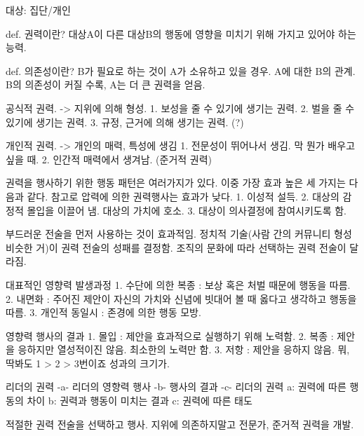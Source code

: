 대상: 집단/개인

def. 권력이란? 대상A이 다른 대상B의 행동에 영향을 미치기 위해 가지고 있어야 하는 능력.

def. 의존성이란? B가 필요로 하는 것이 A가 소유하고 있을 경우. A에 대한 B의 관계.
B의 의존성이 커질 수록, A는 더 큰 권력을 얻음.

공식적 권력. -> 지위에 의해 형성.
  1. 보성을 줄 수 있기에 생기는 권력.
  2. 벌을 줄 수 있기에 생기는 권력.
  3. 규정, 근거에 의해 생기는 권력. (?)

개인적 권력. -> 개인의 매력, 특성에 생김
  1. 전문성이 뛰어나서 생김. 막 뭔가 배우고 싶을 때.
  2. 인간적 매력에서 생겨남. (준거적 권력)

권력을 행사하기 위한 행동 패턴은 여러가지가 있다. 이중 가장 효과 높은 세 가지는 다음과 같다. 
참고로 압력에 의한 권력행사는 효과가 낮다.
  1. 이성적 설득.
  2. 대상의 감정적 몰입을 이끌어 냄. 대상의 가치에 호소.
  3. 대상이 의사결정에 참여시키도록 함.

부드러운 전술을 먼저 사용하는 것이 효과적임.
정치적 기술(사람 간의 커뮤니티 형성 비슷한 거)이 권력 전술의 성패를 결정함.
조직의 문화에 따라 선택하는 권력 전술이 달라짐.

대표적인 영향력 발생과정
1. 수단에 의한 복종 : 보상 혹은 처벌 때문에 행동을 따름.
2. 내면화 : 주어진 제안이 자신의 가치와 신념에 빗대어 볼 때 옳다고 생각하고 행동을 따름.
3. 개인적 동일시 : 존경에 의한 행동 모방.

영향력 행사의 결과
1. 몰입 : 제안을 효과적으로 실행하기 위해 노력함.
2. 복종 : 제안을 응하지만 열성적이진 않음. 최소한의 노력만 함.
3. 저항 : 제안을 응하지 않음.
뭐, 딱봐도 1 > 2 > 3번이죠 성과의 크기가.

리더의 권력 -a- 리더의 영향력 행사 -b- 행사의 결과 -c- 리더의 권력
a: 권력에 따른 행동의 차이
b: 권력과 행동이 미치는 결과
c: 권력에 따른 태도

적절한 권력 전술을 선택하고 행사.
지위에 의존하지말고 전문가, 준거적 권력을 개발.